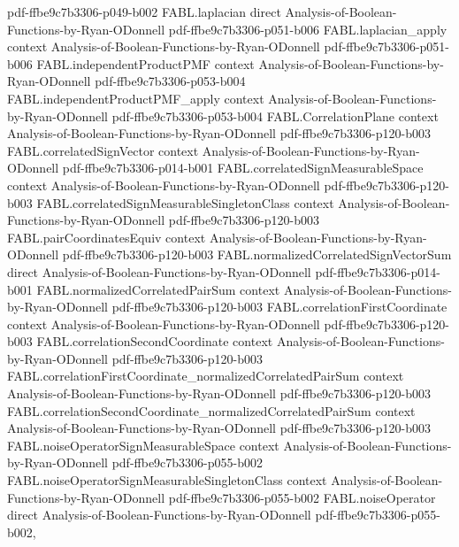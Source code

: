 \begin{theorem}
  {pdf-ffbe9c7b3306-p049-b002}
\proofstep
  {FABL.laplacian}
  {direct}
  {Analysis-of-Boolean-Functions-by-Ryan-ODonnell}
  {pdf-ffbe9c7b3306-p051-b006}
\proofstep
  {FABL.laplacian_apply}
  {context}
  {Analysis-of-Boolean-Functions-by-Ryan-ODonnell}
  {pdf-ffbe9c7b3306-p051-b006}
\proofstep
  {FABL.independentProductPMF}
  {context}
  {Analysis-of-Boolean-Functions-by-Ryan-ODonnell}
  {pdf-ffbe9c7b3306-p053-b004}
\proofstep
  {FABL.independentProductPMF_apply}
  {context}
  {Analysis-of-Boolean-Functions-by-Ryan-ODonnell}
  {pdf-ffbe9c7b3306-p053-b004}
\proofstep
  {FABL.CorrelationPlane}
  {context}
  {Analysis-of-Boolean-Functions-by-Ryan-ODonnell}
  {pdf-ffbe9c7b3306-p120-b003}
\proofstep
  {FABL.correlatedSignVector}
  {context}
  {Analysis-of-Boolean-Functions-by-Ryan-ODonnell}
  {pdf-ffbe9c7b3306-p014-b001}
\proofstep
  {FABL.correlatedSignMeasurableSpace}
  {context}
  {Analysis-of-Boolean-Functions-by-Ryan-ODonnell}
  {pdf-ffbe9c7b3306-p120-b003}
\proofstep
  {FABL.correlatedSignMeasurableSingletonClass}
  {context}
  {Analysis-of-Boolean-Functions-by-Ryan-ODonnell}
  {pdf-ffbe9c7b3306-p120-b003}
\proofstep
  {FABL.pairCoordinatesEquiv}
  {context}
  {Analysis-of-Boolean-Functions-by-Ryan-ODonnell}
  {pdf-ffbe9c7b3306-p120-b003}
\proofstep
  {FABL.normalizedCorrelatedSignVectorSum}
  {direct}
  {Analysis-of-Boolean-Functions-by-Ryan-ODonnell}
  {pdf-ffbe9c7b3306-p014-b001}
\proofstep
  {FABL.normalizedCorrelatedPairSum}
  {context}
  {Analysis-of-Boolean-Functions-by-Ryan-ODonnell}
  {pdf-ffbe9c7b3306-p120-b003}
\proofstep
  {FABL.correlationFirstCoordinate}
  {context}
  {Analysis-of-Boolean-Functions-by-Ryan-ODonnell}
  {pdf-ffbe9c7b3306-p120-b003}
\proofstep
  {FABL.correlationSecondCoordinate}
  {context}
  {Analysis-of-Boolean-Functions-by-Ryan-ODonnell}
  {pdf-ffbe9c7b3306-p120-b003}
\proofstep
  {FABL.correlationFirstCoordinate_normalizedCorrelatedPairSum}
  {context}
  {Analysis-of-Boolean-Functions-by-Ryan-ODonnell}
  {pdf-ffbe9c7b3306-p120-b003}
\proofstep
  {FABL.correlationSecondCoordinate_normalizedCorrelatedPairSum}
  {context}
  {Analysis-of-Boolean-Functions-by-Ryan-ODonnell}
  {pdf-ffbe9c7b3306-p120-b003}
\proofstep
  {FABL.noiseOperatorSignMeasurableSpace}
  {context}
  {Analysis-of-Boolean-Functions-by-Ryan-ODonnell}
  {pdf-ffbe9c7b3306-p055-b002}
\proofstep
  {FABL.noiseOperatorSignMeasurableSingletonClass}
  {context}
  {Analysis-of-Boolean-Functions-by-Ryan-ODonnell}
  {pdf-ffbe9c7b3306-p055-b002}
\proofstep
  {FABL.noiseOperator}
  {direct}
  {Analysis-of-Boolean-Functions-by-Ryan-ODonnell}
  {pdf-ffbe9c7b3306-p055-b002,
}
\end{theorem}
